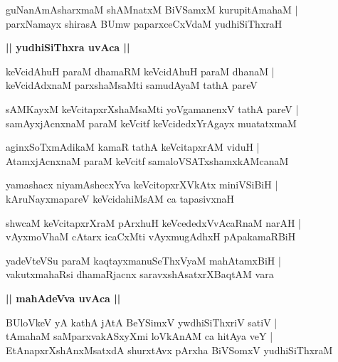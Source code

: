 \documentclass[twoside,12pt,openright]{book}
\newcounter{shloka}[chapter]
\def\uvaca#1{\centerline{{\large\textbf{#1}}}}
\begin{document}
\begin{shloka}%
guNanAmAsharxmaM shAMnatxM BiVSamxM kurupitAmahaM |\\
parxNamayx shirasA BUmw paparxceCxVdaM yudhiSiThxraH 
\end{shloka}

\uvaca{|| yudhiSiThxra uvAca ||}

\begin{shloka}%
keVcidAhuH paraM dhamaRM keVcidAhuH paraM dhanaM |\\
keVcidAdxnaM parxshaMsaMti samudAyaM tathA pareV 
\end{shloka}

\begin{shloka}%
sAMKayxM keVcitapxrXshaMsaMti yoVgamanenxV tathA pareV |\\
samAyxjAcnxnaM paraM keVcitf keVcidedxYrAgayx muatatxmaM 
\end{shloka}

\begin{shloka}%
aginxSoTxmAdikaM kamaR tathA keVcitapxrAM viduH |\\
AtamxjAcnxnaM paraM keVcitf samaloVSATxshamxkAMcanaM 
\end{shloka}

\begin{shloka}%
yamashacx niyamAshecxYva keVcitopxrXVkAtx miniVSiBiH |\\
kAruNayxmapareV keVcidahiMsAM ca tapasivxnaH
\end{shloka}

\begin{shloka}%
shwcaM keVcitapxrXraM pArxhuH keVcededxVvAcaRnaM narAH |\\
vAyxmoVhaM cAtarx icaCxMti vAyxmugAdhxH pApakamaRBiH
\end{shloka}

\begin{shloka}%
yadeVteVSu paraM kaqtayxmanuSeThxVyaM mahAtamxBiH |\\
vakutxmahaRsi dhamaRjacnx saravxshAsatxrXBaqtAM  vara
\end{shloka}

\uvaca{|| mahAdeVva uvAca ||}

\begin{shloka}%
BUloVkeV yA kathA jAtA BeYSimxV ywdhiSiThxriV satiV |\\
tAmahaM saMparxvakASxyXmi loVkAnAM ca hitAya veY |\\
EtAnapxrXshAnxMsatxdA shurxtAvx pArxha BiVSomxV yudhiSiThxraM 
\end{shloka}
\end{document}

